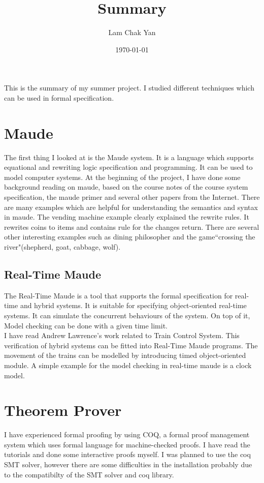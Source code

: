 \documentclass{article}
\begin{document}
\title{Summary}
\author{Lam Chak Yan}
\date{\today}
\maketitle
This is the summary of my summer project. I studied different techniques which can be used in formal specification. 
\section{Maude}
The first thing I looked at is the Maude system. It is a language which supports equational and rewriting logic specification and programming. It can be used to model computer systems. 
At the beginning of the project, I have done some background reading on maude, based on the course notes of the course system specification, the maude primer and several other papers from the Internet. There are many examples which are helpful for understanding the semantics and syntax in maude. The vending machine example clearly explained the rewrite rules. It rewrites coins to items and contains rule for  the changes return. There are several other interesting examples such as dining philosopher and the game``crossing the river"(shepherd, goat, cabbage, wolf).

\subsection{Real-Time Maude}
The Real-Time Maude is a tool that supports the formal specification for real-time and hybrid systems. It is suitable for specifying object-oriented real-time systems. It can simulate the concurrent behaviours of the system. On top of it, Model checking can be done with a given time limit.
\\I have read Andrew Lawrence's work related to Train Control System.  This verification of hybrid systems can be fitted into Real-Time Maude programs.
The movement of the trains can be modelled by introducing timed object-oriented module. A simple example for the model checking in real-time maude is a clock model. 

\section{Theorem Prover}
I have experienced formal proofing by using COQ, a formal proof management system which uses formal language for machine-checked proofs. I have read the tutorials and done some interactive proofs myself. I was planned to use the coq SMT solver, however there are some difficulties in the installation probably due to the compatibilty of the SMT solver and coq library.
\end{document}
